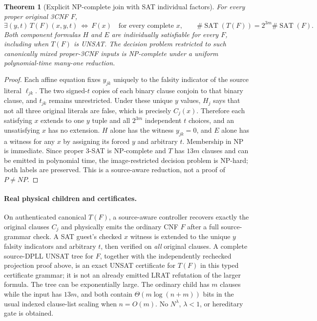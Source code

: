 \documentclass[11pt]{article}
\newtheorem{theorem}{Theorem}
\begin{document}
\begin{theorem}[Explicit NP-complete join with SAT individual factors]
For every proper original 3CNF $F$,
\[
 \exists (y,t)\,T(F)(x,y,t)\ \Longleftrightarrow\ F(x)
 \quad\text{for every complete }x,
 \qquad \#\operatorname{SAT}(T(F))=2^{3m}\#\operatorname{SAT}(F).
\]
Both component formulas $H$ and $E$ are individually satisfiable for \emph{every} $F$, including when $T(F)$ is UNSAT. The decision problem restricted to such canonically mixed proper-3CNF inputs is NP-complete under a uniform polynomial-time many-one reduction.
\end{theorem}
\begin{proof}
Each affine equation fixes $y_{jk}$ uniquely to the falsity indicator of the source literal $\ell_{jk}$. The two signed-$t$ copies of each binary clause conjoin to that binary clause, and $t_{jk}$ remains unrestricted. Under these unique $y$ values, $H_j$ says that not all three original literals are false, which is precisely $C_j(x)$. Therefore each satisfying $x$ extends to one $y$ tuple and all $2^{3m}$ independent $t$ choices, and an unsatisfying $x$ has no extension. $H$ alone has the witness $y_{jk}=0$, and $E$ alone has a witness for any $x$ by assigning its forced $y$ and arbitrary $t$. Membership in NP is immediate. Since proper 3-SAT is NP-complete and $T$ has $13m$ clauses and can be emitted in polynomial time, the image-restricted decision problem is NP-hard; both labels are preserved. This is a source-aware reduction, not a proof of $P\ne NP$.
\end{proof}

\paragraph{Real physical children and certificates.}
On authenticated canonical $T(F)$, a source-aware controller recovers exactly the original clauses $C_j$ and physically emits the ordinary CNF $F$ after a full source-grammar check. A SAT guest's checked $x$ witness is extended to the unique $y$ falsity indicators and arbitrary $t$, then verified on \emph{all} original clauses. A complete source-DPLL UNSAT tree for $F$, together with the independently rechecked projection proof above, is an exact UNSAT certificate for $T(F)$ in this typed certificate grammar; it is not an already emitted LRAT refutation of the larger formula. The tree can be exponentially large. The ordinary child has $m$ clauses while the input has $13m$, and both contain $\Theta(m\log(n+m))$ bits in the usual indexed clause-list scaling when $n=O(m)$. No $N^\lambda$, $\lambda<1$, or hereditary gate is obtained.
\end{document}
